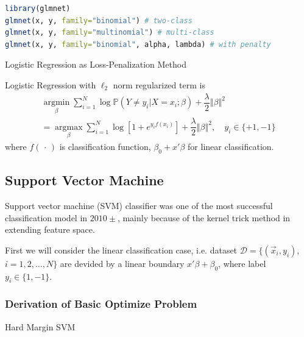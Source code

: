 \begin{rcode}
\begin{lstlisting}[language=R]
library(glmnet)
glmnet(x, y, family="binomial") # two-class 
glmnet(x, y, family="multinomial") # multi-class
glmnet(x, y, family="binomial", alpha, lambda) # with penalty
\end{lstlisting}
\end{rcode}

\begin{point}
    Logistic Regression as Loss-Penalization Method
\end{point}

    Logistic Regression with $ \ell_2 $ norm regularized term is
    \begin{align}
         \mathop{\arg\min}\limits_{\beta }\sum_{i=1}^N\log \mathbb{P}\left( Y\neq y_i|X=x_i;\beta  \right)+\dfrac{\lambda }{2}\left\Vert \beta  \right\Vert ^2\\
         =\mathop{\arg\max}\limits_{\beta }\sum_{i=1}^N\log [1+e^{y_if(x_i)}]+\dfrac{\lambda }{2}\left\Vert \beta  \right\Vert ^2   ,\quad y_i\in\{+1,-1\}    
    \end{align}
    where $ f(\,\cdot\,) $ is classification function, $ \beta _0+x'\beta  $ for linear classification. 
    
    



    



\subsection{Support Vector Machine}
    Support vector machine (SVM) classifier was one of the most successful classification model in $ 2010\pm $, mainly because of the kernel trick method in extending feature space.

    First we will consider the linear classification case, i.e. dataset $\mathcal{D}=\{ (\vec{x}_i,y_i) $, $ i=1,2,\ldots,N \}$ are devided by a linear boundary $ x'\beta +\beta _0 $, where label $ y_i\in\{1,-1\} $.

\subsubsection{Derivation of Basic Optimize Problem}
\begin{point}
    Hard Margin SVM
\end{point}


